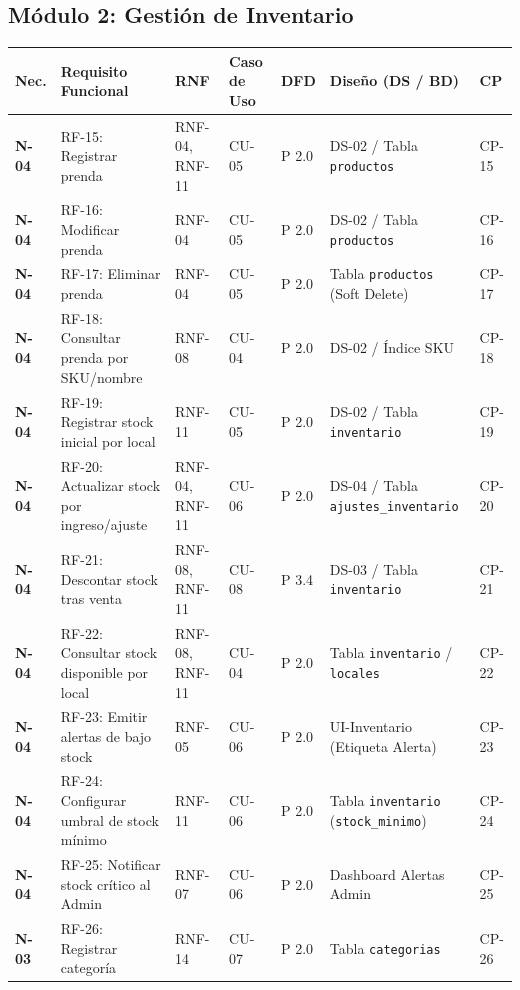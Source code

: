 \subsection{M\'odulo 2: Gesti\'on de Inventario}
\begin{table}[H]
\centering\scriptsize
\begin{tabularx}{\textwidth}{>{\centering\bfseries}p{1.2cm} Y >{\centering\arraybackslash}p{2.0cm} >{\centering\arraybackslash}p{1.5cm} >{\centering\arraybackslash}p{1.0cm} >{\raggedright\arraybackslash}p{3.0cm} >{\centering\arraybackslash}p{1.2cm}}
\toprule
\textbf{Nec.} & \textbf{Requisito Funcional} & \textbf{RNF} & \textbf{Caso de Uso} & \textbf{DFD} & \textbf{Dise\~no (DS / BD)} & \textbf{CP} \\
\midrule
N-04 & RF-15: Registrar prenda & RNF-04, RNF-11 & CU-05 & P 2.0 & DS-02 / Tabla \texttt{productos} & CP-15 \\
N-04 & RF-16: Modificar prenda & RNF-04 & CU-05 & P 2.0 & DS-02 / Tabla \texttt{productos} & CP-16 \\
N-04 & RF-17: Eliminar prenda & RNF-04 & CU-05 & P 2.0 & Tabla \texttt{productos} (Soft Delete) & CP-17 \\
N-04 & RF-18: Consultar prenda por SKU/nombre & RNF-08 & CU-04 & P 2.0 & DS-02 / \'{I}ndice SKU & CP-18 \\
N-04 & RF-19: Registrar stock inicial por local & RNF-11 & CU-05 & P 2.0 & DS-02 / Tabla \texttt{inventario} & CP-19 \\
N-04 & RF-20: Actualizar stock por ingreso/ajuste & RNF-04, RNF-11 & CU-06 & P 2.0 & DS-04 / Tabla \texttt{ajustes\_inventario} & CP-20 \\
N-04 & RF-21: Descontar stock tras venta & RNF-08, RNF-11 & CU-08 & P 3.4 & DS-03 / Tabla \texttt{inventario} & CP-21 \\
N-04 & RF-22: Consultar stock disponible por local & RNF-08, RNF-11 & CU-04 & P 2.0 & Tabla \texttt{inventario} / \texttt{locales} & CP-22 \\
N-04 & RF-23: Emitir alertas de bajo stock & RNF-05 & CU-06 & P 2.0 & UI-Inventario (Etiqueta Alerta) & CP-23 \\
N-04 & RF-24: Configurar umbral de stock m\'inimo & RNF-11 & CU-06 & P 2.0 & Tabla \texttt{inventario} (\texttt{stock\_minimo}) & CP-24 \\
N-04 & RF-25: Notificar stock cr\'itico al Admin & RNF-07 & CU-06 & P 2.0 & Dashboard Alertas Admin & CP-25 \\
N-03 & RF-26: Registrar categor\'ia & RNF-14 & CU-07 & P 2.0 & Tabla \texttt{categorias} & CP-26 \\

\end{tabularx}
\end{table}
